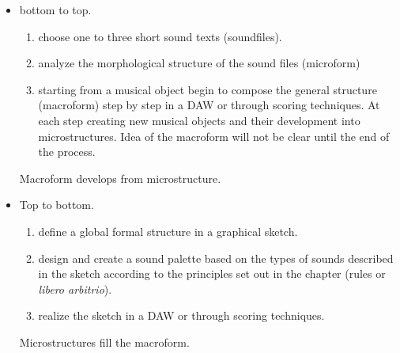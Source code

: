 \begin{itemize}

\item bottom to top.

   \begin{enumerate}
   \def\labelenumi{\arabic{enumi}.}
   \tightlist
   \item choose one to three short sound texts (soundfiles). 
   \item analyze the morphological structure of the sound files (microform) 
   \item starting from a musical object begin to compose the general structure (macroform) step by step in a DAW or through scoring techniques. At each step creating new musical objects and their development into microstructures. Idea of the macroform will not be clear until the end of the process.
  \end{enumerate}
    Macroform develops from microstructure.

\item Top to bottom.

  \begin{enumerate}
  \def\labelenumi{\arabic{enumi}.}
  \tightlist
  \item define a global formal structure in a graphical sketch.
  \item design and create a sound palette based on the types of sounds described in the sketch according to the principles set out in the chapter (rules or \textit{libero arbitrio}).
  \item realize the sketch in a DAW or through scoring techniques.
  \end{enumerate}

  Microstructures fill the macroform.
\end{itemize}